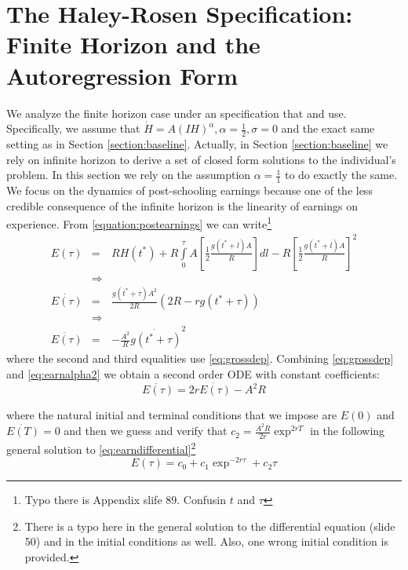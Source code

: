\section{The Haley-Rosen Specification: Finite Horizon and the Autoregression Form}
We analyze the finite horizon case under an specification that \citet{haley1976estimation} and \citet{rosen1976theory} use. Specifically, we assume that $\dot{H} = A \left( IH \right)^{\alpha}, \alpha = \frac{1}{2}, \sigma = 0$ and the exact same setting as in Section \ref{section:baseline}. Actually, in Section \ref{section:baseline} we rely on infinite horizon to derive a set of closed form solutions to the individual's problem. In this section we rely on the assumption $\alpha = \frac{1}{1}$ to do exactly the same.\\
\indent We focus on the dynamics of post-schooling earnings because one of the less credible consequence of the infinite horizon is the linearity of earnings on experience. From \eqref{equation:postearnings} we can write\footnote{Typo there is Appendix slife 89. Confusin $t$ and $\tau$}
\begin{eqnarray}
E(\tau) &=& RH(t^*) + R \int \limits _{0} ^{\tau} A \left[\frac{1}{2} \frac{g(t^* + l)A}{R} \right]dl - R \left[\frac{1}{2} \frac{g(t^* + l)A}{R} \right]^{2} \nonumber \\
&\Rightarrow& \nonumber \\
\dot{E(\tau)} &=& \frac{g (t^* + \tau)A^2}{2R}\left( 2R -rg (t^* + \tau) \right) \nonumber \\
&\Rightarrow& \nonumber \\
\ddot{E(\tau)} &=& -\frac{A^2}{R}\dot{g(t^* + \tau)}^2 \label{eq:earnalpha2}
\end{eqnarray}
where the second and third equalities use \eqref{eq:grossdep}. Combining \eqref{eq:grossdep} and \eqref{eq:earnalpha2} we obtain a second order ODE with constant coefficients:
\begin{equation}
\ddot{E(\tau)} = 2r \dot{E(\tau)} - A^2 R \label{eq:earndifferential}
\end{equation} 

\noindent where the natural initial and terminal conditions that we impose are $E(0)$ and $\ddot{E(T)} = 0$ and then we guess and verify that $c_{2} = \frac{A^2 R}{2r}\exp^{2rT}$ in the following general solution to \eqref{eq:earndifferential}\footnote{There is a typo here in the general solution to the differential equation (slide 50) and in the initial conditions as well. Also, one wrong initial condition is provided.}
\begin{equation}
E(\tau) = c_{0} + c_{1}\exp^{-2r \tau} + c_{2} \tau
\end{equation}

